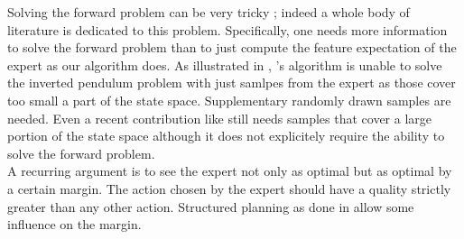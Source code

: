 \documentclass{article}
\begin{document}
Solving the forward problem can be very tricky ; indeed a whole body of literature is dedicated to this problem. Specifically, one needs more information to solve the forward problem than to just compute the feature expectation of the expert as our algorithm does. As illustrated in \cite{klein2011batch}, \citep{abbeel2004apprenticeship}'s algorithm is unable to solve the inverted pendulum problem with just samlpes from the expert as those cover too small a part of the state space. Supplementary randomly drawn samples are needed. Even a recent contribution like \cite{boularias2011relative} still needs samples that cover a large portion of the state space although it does not explicitely require the ability to solve the forward problem.\\


A recurring argument is to see the expert not only as optimal but as optimal by a certain margin. The action chosen by the expert should have a quality strictly greater than any other action. Structured planning as done in \cite{ratliff2006maximum,ratliff2007imitation, ratliff2007boosting, kolter2008hierarchical} allow some influence on the margin.\\
\end{document}
